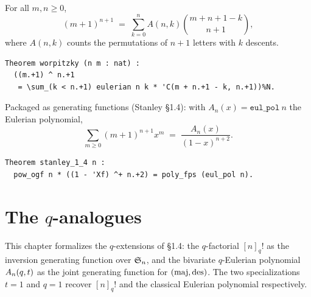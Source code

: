 \begin{theorem}[Worpitzky]
  For all $m, n \geq 0$,
  \[
    (m+1)^{n+1} \;=\; \sum_{k=0}^{n} A(n,k) \binom{m+n+1-k}{n+1},
  \]
  where $A(n,k)$ counts the permutations of $n+1$ letters with $k$
  descents.
\end{theorem}

\begin{lstlisting}[language=Rocq]
Theorem worpitzky (n m : nat) :
  ((m.+1) ^ n.+1
   = \sum_(k < n.+1) eulerian n k * 'C(m + n.+1 - k, n.+1))%N.
\end{lstlisting}


\noindent Packaged as generating functions (Stanley \S1.4): with
$A_n(x) = \texttt{eul\_pol}\ n$ the Eulerian polynomial,
\[
  \sum_{m \geq 0} (m+1)^{n+1} x^m \;=\; \frac{A_n(x)}{(1-x)^{n+2}}.
\]

\begin{lstlisting}[language=Rocq]
Theorem stanley_1_4 n :
  pow_ogf n * ((1 - 'Xf) ^+ n.+2) = poly_fps (eul_pol n).
\end{lstlisting}


\clearpage

\chapter{The $q$-analogues}
\label{ch:qanalogues}

This chapter formalizes the $q$-extensions of \S1.4: the
$q$-factorial $[n]_q!$ as the inversion generating function over
$\mathfrak{S}_{n}$, and the bivariate $q$-Eulerian polynomial
$A_n(q, t)$ as the joint generating function for
$(\mathrm{maj}, \mathrm{des})$. The two specializations $t = 1$ and $q = 1$ recover
$[n]_q!$ and the classical Eulerian polynomial respectively.

